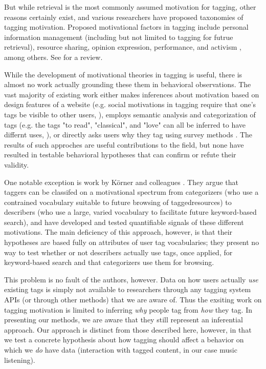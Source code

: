 But while retrieval is the most commonly assumed motivation for tagging, other reasons certainly exist, and various researchers have proposed taxonomies of tagging motivation. Proposed motivational factors in tagging include personal information management (including but not limited to tagging for futrue retrieval), resource sharing, opinion expression, performance, and activism \cite{Heckner2009,Zollers2007,Ames2007}, among others. See \cite{Gupta2010} for a review.

While the development of motivational theories in tagging is useful, there is almost no work actually grounding these them in behavioral observations. The vast majority of existing work either makes inferences about  motivation based on design features of a website (e.g. social motivations in tagging require that one's tags be visible to other users, \cite{Marlow2006}), employs semantic analysis and categorization of tags (e.g. the tags "to read", "classical", and "love" can all be inferred to have differnt uses, \cite{Zollers2007,Sen2006}), or directly asks users why they tag using survey methods \cite{Ames2007,Nov2008}. The results of such approches are useful contributions to the field, but none have resulted in testable behavioral hypotheses that can confirm or refute their validity. 

One notable exception is work by  K\"{o}rner and colleagues \cite{Korner2010,Korner2010a,Zubiaga2011}. They argue that taggers can be classifed on a motivational spectrum from categorizers (who use a contrained vocabulary suitable to future browsing of taggedresources) to describers (who use a large, varied vocabulary to facilitate future keyword-based search), and have developed and tested quantifiable signals of these different motivations. The main deficiency of this approach, however, is that their hypotheses are based fully on attributes of user tag vocabularies; they present no way to test whether or not describers actually use tags, once applied, for keyword-based search and that categorizers use them for browsing.

This problem is no fault of the authors, however. Data on how users actually \emph{use} existing tags is simply not available to researchers through any tagging system APIs (or through other methods) that we are aware of. Thus the exsiting work on tagging motivation is limited to inferring \emph{why} people tag from \emph{how} they tag. In presenting our methods, we are aware that they still represent an inferential approach. Our approach is distinct from those described here, however, in that we test a concrete hypothesis about how tagging should affect a behavior on which we \emph{do} have data (interaction with tagged content, in our case music listening).
